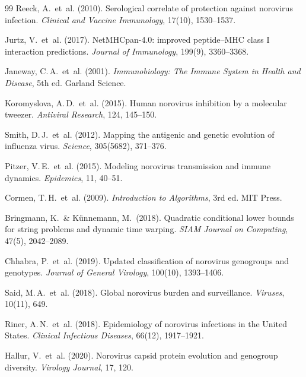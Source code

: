 ﻿\documentclass[a4paper,12pt]{article}
\theoremstyle{plain}
\theoremstyle{definition}
\theoremstyle{remark}
\begin{document}
\begin{thebibliography}{99}
Reeck, A.\ et~al. (2010).
Serological correlate of protection against norovirus infection.
\emph{Clinical and Vaccine Immunology}, 17(10), 1530--1537.

Jurtz, V.\ et~al. (2017).
NetMHCpan-4.0: improved peptide--MHC class I interaction predictions.
\emph{Journal of Immunology}, 199(9), 3360--3368.

Janeway, C.\,A.\ et~al. (2001).
\emph{Immunobiology: The Immune System in Health and Disease}, 5th ed.
Garland Science.

Koromyslova, A.\,D.\ et~al. (2015).
Human norovirus inhibition by a molecular tweezer.
\emph{Antiviral Research}, 124, 145--150.

Smith, D.\,J.\ et~al. (2012).
Mapping the antigenic and genetic evolution of influenza virus.
\emph{Science}, 305(5682), 371--376.

Pitzer, V.\,E.\ et~al. (2015).
Modeling norovirus transmission and immune dynamics.
\emph{Epidemics}, 11, 40--51.

Cormen, T.\,H.\ et~al. (2009).
\emph{Introduction to Algorithms}, 3rd ed.
MIT Press.

Bringmann, K.\ \& Künnemann, M.\ (2018).
Quadratic conditional lower bounds for string problems and dynamic time warping.
\emph{SIAM Journal on Computing}, 47(5), 2042--2089.

Chhabra, P.\ et~al. (2019).
Updated classification of norovirus genogroups and genotypes.
\emph{Journal of General Virology}, 100(10), 1393--1406.

Said, M.\,A.\ et~al. (2018).
Global norovirus burden and surveillance.
\emph{Viruses}, 10(11), 649.

Riner, A.\,N.\ et~al. (2018).
Epidemiology of norovirus infections in the United States.
\emph{Clinical Infectious Diseases}, 66(12), 1917--1921.

Hallur, V.\ et~al. (2020).
Norovirus capsid protein evolution and genogroup diversity.
\emph{Virology Journal}, 17, 120.


\end{thebibliography}
\end{document}

